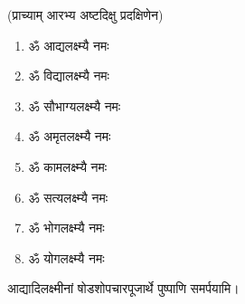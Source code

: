 (प्राच्याम् आरभ्य अष्टदिक्षु प्रदक्षिणेन)

\begin{multicols}{2}
\begin{enumerate}
\item ॐ आद्यलक्ष्म्यै नमः
\item ॐ विद्यालक्ष्म्यै नमः
\item ॐ सौभाग्यलक्ष्म्यै नमः
\item ॐ अमृतलक्ष्म्यै नमः
\item ॐ कामलक्ष्म्यै नमः 
\item ॐ सत्यलक्ष्म्यै नमः
\item ॐ भोगलक्ष्म्यै नमः
\item ॐ योगलक्ष्म्यै नमः
\end{enumerate}
\end{multicols}

आद्यादिलक्ष्मीनां षोडशोपचारपूजार्थे पुष्पाणि समर्पयामि।

\begingroup
\setlength{\columnseprule}{1pt}
\let\chapt\sect

\endgroup



